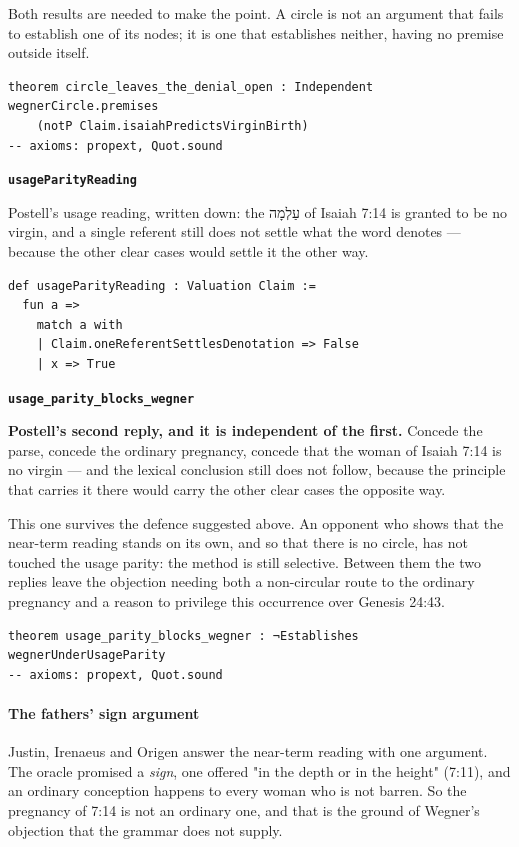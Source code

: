 \documentclass[11pt]{article}
\begin{document}
Both results are needed to make the point. A circle is not an argument that fails to establish one of its nodes; it is one that establishes neither, having no premise outside itself.

{\small\begin{verbatim}
theorem circle_leaves_the_denial_open : Independent wegnerCircle.premises
    (notP Claim.isaiahPredictsVirginBirth)
-- axioms: propext, Quot.sound
\end{verbatim}}
\par\medskip\noindent\textbf{\texttt{usage\allowbreak{}Parity\allowbreak{}Reading}}\par\nobreak\noindent
Postell's usage reading, written down: the עַלְמָה of Isaiah 7:14 is granted to be no virgin, and a single referent still does not settle what the word denotes — because the other clear cases would settle it the other way.

{\small\begin{verbatim}
def usageParityReading : Valuation Claim :=
  fun a =>
    match a with
    | Claim.oneReferentSettlesDenotation => False
    | x => True
\end{verbatim}}
\par\medskip\noindent\textbf{\texttt{usage\_\allowbreak{}parity\_\allowbreak{}blocks\_\allowbreak{}wegner}}\par\nobreak\noindent
\textbf{Postell's second reply, and it is independent of the first.} Concede the parse, concede the ordinary pregnancy, concede that the woman of Isaiah 7:14 is no virgin — and the lexical conclusion still does not follow, because the principle that carries it there would carry the other clear cases the opposite way.

This one survives the defence suggested above. An opponent who shows that the near-term reading stands on its own, and so that there is no circle, has not touched the usage parity: the method is still selective. Between them the two replies leave the objection needing both a non-circular route to the ordinary pregnancy and a reason to privilege this occurrence over Genesis 24:43.

{\small\begin{verbatim}
theorem usage_parity_blocks_wegner : ¬Establishes wegnerUnderUsageParity
-- axioms: propext, Quot.sound
\end{verbatim}}
\paragraph*{The fathers' sign argument}
\leavevmode\par
Justin, Irenaeus and Origen answer the near-term reading with one argument. The oracle promised a \emph{sign}, one offered "in the depth or in the height" (7:11), and an ordinary conception happens to every woman who is not barren. So the pregnancy of 7:14 is not an ordinary one, and that is the ground of Wegner's objection that the grammar does not supply.
\end{document}
